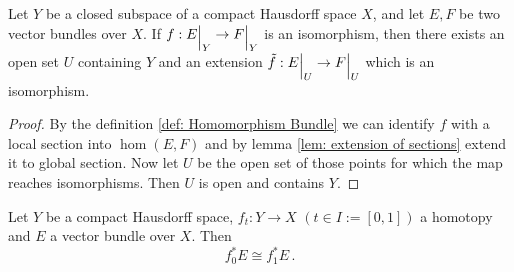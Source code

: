 \begin{lemma}\label{lem: Extension of Isomorphisms of Homomorphisms}
	Let $Y$ be a closed subspace of a compact Hausdorff space $X$, and let $E,F$ be two vector bundles over $X$. If $f:{E}\einsch{Y}\to {F}\einsch{Y}$ is an isomorphism, then there exists an open set $U$ containing $Y$ and an extension $\Tilde{f}:{E}\einsch{U}\to {F}\einsch{U}$ which is an isomorphism.
\end{lemma}
\begin{proof}
	By the definition \ref{def: Homomorphism Bundle} we can identify $f$ with a local section into $\hom(E,F)$ and by lemma \ref{lem: extension of sections} extend it to global section. Now let $U$ be the open set of those points for which the map reaches isomorphisms. Then $U$ is open and contains $Y$.
\end{proof}
\begin{lemma}\label{lem: Induced Bundles are Homotopy Invariant}
	Let $Y$ be a compact Hausdorff space, $f_t:Y\to X$ $(t\in I:=[0,1])$ a homotopy and $E$ a vector bundle over $X$. Then
	\begin{equation*}
		f^*_0E\cong f^*_1E\, .
	\end{equation*}
\end{lemma}
